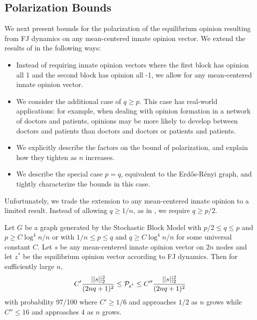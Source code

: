 \subsection{Polarization Bounds}
We next present bounds for the polarization of the equilibrium
opinion resulting from FJ dynamics on any mean-centered
innate opinion vector. We extend the results of \cite{chitra20analyzing}
in the following ways:
\begin{itemize}
  \item Instead of requiring innate opinion vectors where the first block
  has opinion all 1 and the second block has opinion all -1,
  we allow for any mean-centered innate opinion vector.
  \item We consider the additional case of $q \geq p$. This case has real-world applications: for example, when dealing with opinion formation in a network of doctors and patients, opinions may be more likely to develop between doctors and patients
  than doctors and doctors or patients and patients.
  \item We explicitly describe the factors on the bound
  of polarization, and explain how they tighten as $n$ increases.
  \item We describe the special case $p=q$, equivalent to
  the Erdős-Rényi graph, and tightly characterize the bounds
  in this case.
\end{itemize}
Unfortunately, we trade the extension to any mean-centered
innate opinion to a limited result.
Instead of allowing $q \geq 1/n$, as in \cite{chitra20analyzing},
we require $q \geq p/2$.

\begin{theorem}\label{thm:converge}
  Let $G$ be a graph generated by the Stochastic Block Model
  with $p/2 \leq q \leq p$ and $p \geq C \log^4n/n$ or
  with $1/n \leq p \leq q$ and $q \geq C \log^4n/n$
  for some universal constant $C$.
  Let $s$ be any mean-centered innate opinion vector
  on $2n$ nodes and let $z^*$ be the equilibrium opinion
  vector according to FJ dynamics.
  Then for sufficiently large $n$,
  \begin{align}
    C' \frac{||s||_2^2}{(2nq+1)^2} \leq \operatorname*{\mathcal{P}_{z^*}} \leq
    C'' \frac{||s||_2^2}{(2nq+1)^2}
    \nonumber
  \end{align}
  with probability 97/100 where $C' \geq 1/6$
  and approaches $1/2$ as $n$ grows while
  $C'' \leq 16$ and approaches $4$ as $n$ grows.
\end{theorem}

